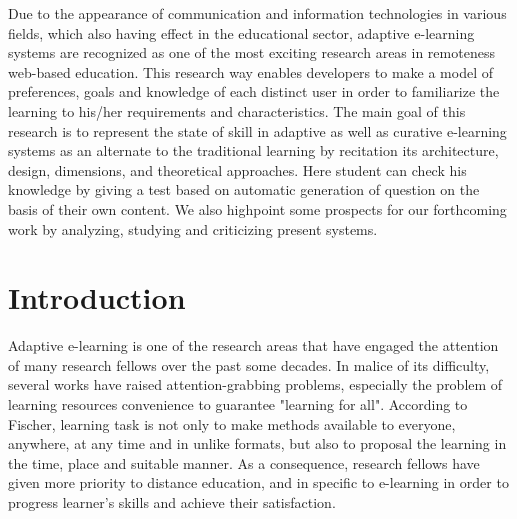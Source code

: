Due to the appearance of communication and information technologies in various fields, which also having effect in the educational sector, adaptive e-learning systems are recognized as one of the most exciting research areas in remoteness web-based education. This research way enables developers to make a model of preferences, goals and knowledge of each distinct user in order to familiarize the learning to his/her requirements and characteristics. The main goal of this research is to represent the state of skill in adaptive as well as curative e-learning systems as an alternate to the traditional learning by recitation its architecture, design, dimensions, and theoretical approaches. Here student can check his knowledge by giving a test based on automatic generation of question on the basis of their own content. We also highpoint some prospects for our forthcoming work by analyzing, studying and criticizing present systems.

%
%
%
%
%
%
%
\tableofcontents
%
%
%

%
\listoffigures
%
%

\mainmatter
%
%
\chapter{Introduction}

Adaptive e-learning is one of the research areas that have engaged the attention of many research fellows over the past some decades. In malice of its difficulty, several works have raised attention-grabbing problems, especially the problem of learning resources convenience to guarantee "learning for all". According to Fischer, learning task is not only to make methods available to everyone, anywhere, at any time and in unlike formats, but also to proposal the learning in the time, place and suitable manner. As a consequence, research fellows have given more priority to distance education, and in specific to e-learning in order to progress learner's skills and achieve their satisfaction. \\

